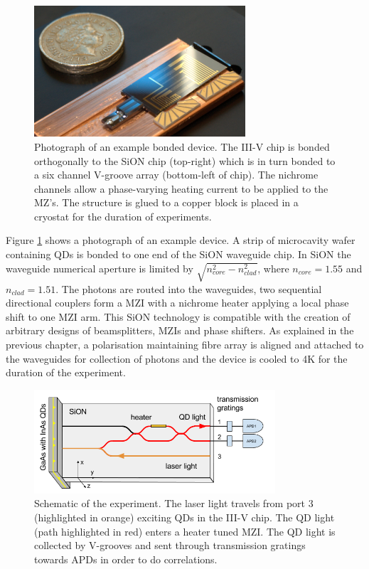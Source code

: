 \begin{figure}[h!] \begin{center}
\includegraphics[width=0.7\textwidth]{images/h2.jpg} \caption{
Photograph of an example bonded device. The III-V chip is bonded orthogonally to
the  SiON chip (top-right) which is in turn bonded to a six channel V-groove
array (bottom-left of chip). The nichrome channels allow a phase-varying heating
current to be applied to the MZ's. The structure is glued to a copper block is
placed in a cryostat for the duration of experiments.
} \label{fig:photo} \end{center} \end{figure}

Figure \ref{fig:photo} shows a photograph of an example device. A strip of
microcavity wafer containing QDs is bonded to one end of the SiON waveguide
chip.  In SiON the waveguide numerical aperture is limited by $\sqrt{n_{core}^2 - n_{clad}^2}$, where $n_{core} =
\mathrm{1.55}$ and $n_{clad} = \mathrm{1.51}$.  The photons are routed into the waveguides, two sequential
directional couplers form a MZI with a nichrome heater applying a local phase
shift to one MZI arm. This SiON technology is compatible with the creation of
arbitrary designs of beamsplitters, MZIs and phase shifters. As explained in the
previous chapter, a polarisation maintaining fibre array is aligned and attached
to the waveguides for collection of photons and the device is cooled to 4K for
the duration of the experiment.

\begin{figure}[h!] \begin{center}
\includegraphics[width=0.8\textwidth]{images/hyb.png} \caption{
Schematic of the experiment. The laser light travels from port 3 (highlighted in
orange) exciting QDs in the III-V chip. The QD light (path highlighted in red)
enters a heater tuned MZI. The QD light is collected by V-grooves and sent
through transmission gratings towards APDs in order to do correlations.
} \label{fig:schem} \end{center} \end{figure}

